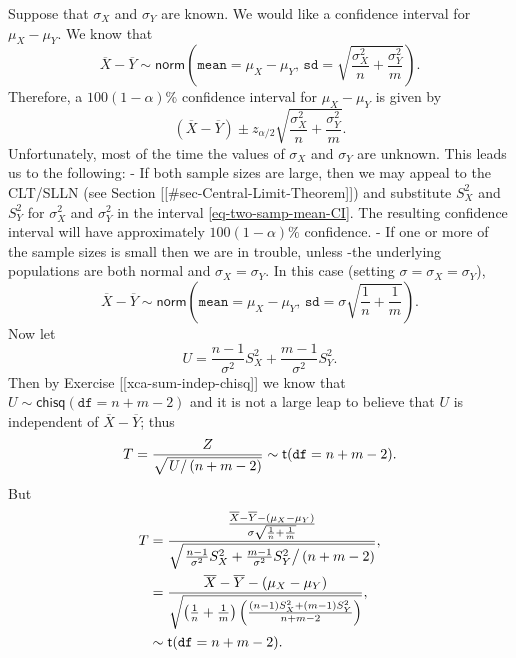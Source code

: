 Suppose that \(\sigma_{X}\) and \(\sigma_{Y}\) are known. We would
like a confidence interval for \(\mu_{X}-\mu_{Y}\). We know that
\begin{equation}
\overline{X}-\overline{Y}\sim\mathsf{norm}\left(\mathtt{mean}=\mu_{X}-\mu_{Y},\,\mathtt{sd}=\sqrt{\frac{\sigma_{X}^{2}}{n}+\frac{\sigma_{Y}^{2}}{m}}\right).
\end{equation}
Therefore, a \( 100(1-\alpha)\% \) confidence interval for
\(\mu_{X}-\mu_{Y}\) is given by
\begin{equation}
\label{eq-two-samp-mean-CI}
\left(\overline{X}-\overline{Y}\right)\pm z_{\alpha/2}\sqrt{\frac{\sigma_{X}^{2}}{n}+\frac{\sigma_{Y}^{2}}{m}}.
\end{equation}
Unfortunately, most of the time the values of \(\sigma_{X}\) and
\(\sigma_{Y}\) are unknown. This leads us to the following:
- If both sample sizes are large, then we may appeal to the CLT/SLLN
  (see Section [[#sec-Central-Limit-Theorem]]) and substitute \(S_{X}^{2}\) and
  \(S_{Y}^{2}\) for \(\sigma_{X}^{2}\) and \(\sigma_{Y}^{2}\) in the
  interval \eqref{eq-two-samp-mean-CI}. The resulting confidence interval will
  have approximately \(100(1-\alpha)\%\) confidence.
- If one or more of the sample sizes is small then we are in trouble,
  unless -the underlying populations are both normal and
  \(\sigma_{X}=\sigma_{Y}\). In this case (setting
  \(\sigma=\sigma_{X}=\sigma_{Y}\)),
  \begin{equation}
  \overline{X}-\overline{Y}\sim\mathsf{norm}\left(\mathtt{mean}=\mu_{X}-\mu_{Y},\,\mathtt{sd}=\sigma\sqrt{\frac{1}{n}+\frac{1}{m}}\right).
  \end{equation} 
  Now let
  \begin{equation}
  U=\frac{n-1}{\sigma^{2}}S_{X}^{2}+\frac{m-1}{\sigma^{2}}S_{Y}^{2}.
  \end{equation}
  Then by Exercise [[xca-sum-indep-chisq]] we know that
  \(U\sim\mathsf{chisq}(\mathtt{df}=n+m-2)\) and it is not a large
  leap to believe that \(U\) is independent of
  \(\overline{X}-\overline{Y}\); thus
  \begin{equation}
  T = \frac{Z}{\sqrt{\left.U\right/ (n+m-2)}}\sim\mathsf{t}(\mathtt{df}=n+m-2).
  \end{equation}
  But
  \begin{align*}
  T & =\frac{\frac{\overline{X}-\overline{Y}-(\mu_{X}-\mu_{Y})}{\sigma\sqrt{\frac{1}{n}+\frac{1}{m}}}}{\sqrt{\left.\frac{n-1}{\sigma^{2}}S_{X}^{2}+\frac{m-1}{\sigma^{2}}S_{Y}^{2}\right/ (n+m-2)}},\\
  & =\frac{\overline{X}-\overline{Y}-(\mu_{X}-\mu_{Y})}{\sqrt{\left(\frac{1}{n}+\frac{1}{m}\right)\left(\frac{(n-1)S_{X}^{2}+(m-1)S_{Y}^{2}}{n+m-2}\right)}},\\
  & \sim\mathsf{t}(\mathtt{df}=n+m-2).
  \end{align*}
